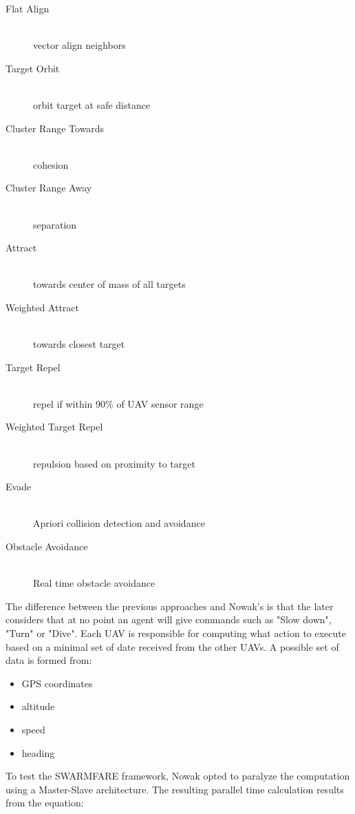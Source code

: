 \begin{description}
\item [Flat Align] \hfill \\ vector align neighbors
\item [Target Orbit] \hfill \\ orbit target at safe distance
\item [Cluster Range Towards] \hfill \\ cohesion
\item [Cluster Range Away] \hfill \\ separation
\item [Attract] \hfill \\ towards center of mass of all targets
\item [Weighted Attract] \hfill \\ towards closest target
\item [Target Repel] \hfill \\ repel if within 90\% of UAV sensor range
\item [Weighted Target Repel] \hfill \\ repulsion based on proximity to target
\item [Evade] \hfill \\ Apriori collision detection and avoidance
\item [Obstacle Avoidance] \hfill \\ Real time obstacle avoidance
\end{description}

The difference between the previous approaches and Nowak's is that the later
considers that at no point an agent will give commands such as "Slow down", "Turn" or
"Dive". Each UAV is responsible for computing what action to execute based on 
a minimal set of date received from the other UAVs. A possible set of data
is formed from:
\begin{itemize}
\item GPS coordinates
\item altitude
\item speed
\item heading
\end{itemize}

To test the SWARMFARE framework, Nowak opted to paralyze the computation
using a Master-Slave architecture. The resulting parallel time calculation
results from the equation:

